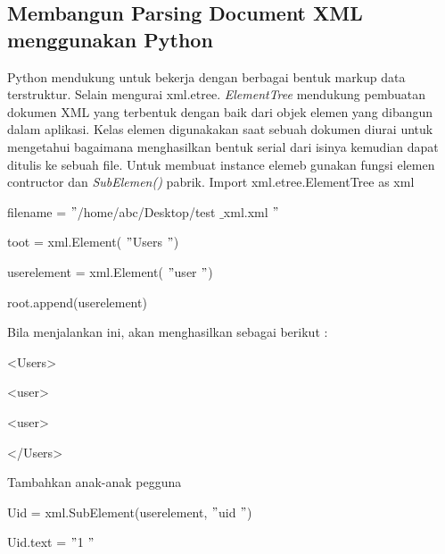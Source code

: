 \subsection{Membangun Parsing Document XML menggunakan Python} 
Python mendukung untuk bekerja dengan berbagai bentuk markup data terstruktur. Selain mengurai xml.etree. \textit{ElementTree} mendukung pembuatan dokumen XML yang terbentuk dengan baik dari objek elemen yang dibangun dalam aplikasi. Kelas elemen digunakakan saat sebuah dokumen diurai untuk mengetahui bagaimana menghasilkan bentuk serial dari isinya kemudian dapat ditulis ke sebuah file.  
Untuk membuat instance elemeb gunakan fungsi elemen contructor dan \textit{SubElemen()} pabrik. 
Import xml.etree.ElementTree as xml \par
\vspace{12pt}
\noindent 
{\fontsize{10pt}{10pt}\selectfont filename =  $ " $/home/abc/Desktop/test $  \_  $xml.xml $ " $} \par
\noindent 
{\fontsize{10pt}{10pt}\selectfont toot = xml.Element( $ " $Users $ " $)} \par
\noindent 
{\fontsize{10pt}{10pt}\selectfont userelement = xml.Element( $ " $user $ " $)} \par
\noindent 
{\fontsize{10pt}{10pt}\selectfont root.append(userelement)} \par
\noindent 
\vspace{10pt}
\noindent 
Bila menjalankan ini, akan menghasilkan sebagai berikut : \par
\noindent 
{\fontsize{10pt}{10pt}\selectfont <Users>} \par
\noindent 
{\fontsize{10pt}{10pt}\selectfont  \hspace*{0.5in} <user>} \par
\noindent 
{\fontsize{10pt}{10pt}\selectfont  \hspace*{0.5in} <user>} \par
\noindent 
{\fontsize{10pt}{10pt}\selectfont </Users>} \par
\vspace{10pt}
\vspace{10pt}
\vspace{10pt}
\noindent 
Tambahkan anak-anak pegguna \par
\vspace{10pt}
\noindent 
{\fontsize{10pt}{10pt}\selectfont Uid = xml.SubElement(userelement,  $ " $uid $ " $)} \par
\noindent 
{\fontsize{10pt}{10pt}\selectfont Uid.text =  $ " $1 $ " $} \par
